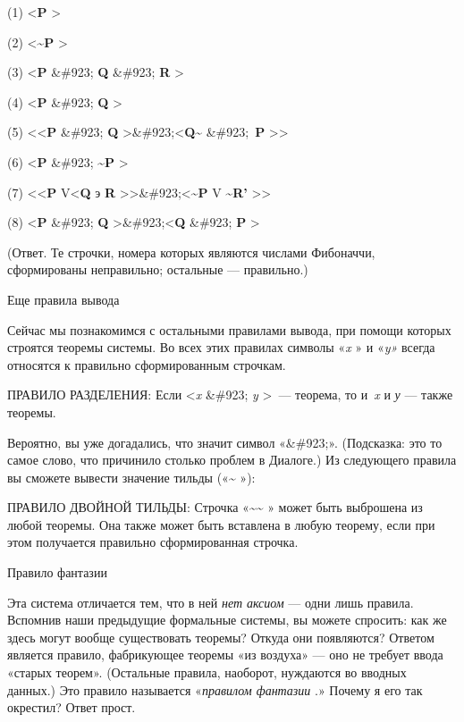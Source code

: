 (1) \textless{}\textbf{P} \textgreater{}

(2) \textless{}\textbf{\textasciitilde P} \textgreater{}

(3) \textless{}\textbf{P} \&\#923; \textbf{Q} \&\#923; \textbf{R} \textgreater{}

(4) \textless{}\textbf{P} \&\#923; \textbf{Q} \textgreater{}

(5) \textless\textless{}\textbf{P} \&\#923; \textbf{Q} \textgreater\&\#923;\textless{}\textbf{Q\textasciitilde{}} \&\#923;~\textbf{P} \textgreater\textgreater{}

(6) \textless{}\textbf{P} \&\#923; \textbf{\textasciitilde P} \textgreater{}

(7) \textless\textless{}\textbf{P} V\textless{}\textbf{Q} э \textbf{R} \textgreater\textgreater\&\#923;\textless{}\textbf{\textasciitilde P} V \textbf{\textasciitilde R'} \textgreater\textgreater{}

(8) \textless{}\textbf{P} \&\#923; \textbf{Q} \textgreater\&\#923;\textless{}\textbf{Q} \&\#923; \textbf{P} \textgreater{}

(Ответ. Те строчки, номера которых являются числами Фибоначчи, сформированы неправильно; остальные --- правильно.)

Еще правила вывода

Сейчас мы познакомимся с остальными правилами вывода, при помощи которых строятся теоремы системы. Во всех этих правилах символы «\emph{x} » и «\emph{y»} всегда относятся к правильно сформированным строчкам.

ПРАВИЛО РАЗДЕЛЕНИЯ: Если \textless{}\emph{x} \&\#923; \emph{y} \textgreater~--- теорема, то и~\emph{x} и \emph{у} --- также теоремы.

Вероятно, вы уже догадались, что значит символ «\&\#923;». (Подсказка: это то самое слово, что причинило столько проблем в Диалоге.) Из следующего правила вы сможете вывести значение тильды («\textbf{\textasciitilde{}} »):

ПРАВИЛО ДВОЙНОЙ ТИЛЬДЫ: Строчка «\textbf{\textasciitilde\textasciitilde{}} » может быть выброшена из любой теоремы. Она также может быть вставлена в любую теорему, если при этом получается правильно сформированная строчка.

Правило фантазии

Эта система отличается тем, что в ней \emph{нет аксиом} --- одни лишь правила. Вспомнив наши предыдущие формальные системы, вы можете спросить: как же здесь могут вообще существовать теоремы? Откуда они появляются? Ответом является правило, фабрикующее теоремы «из воздуха» --- оно не требует ввода «старых теорем». (Остальные правила, наоборот, нуждаются во вводных данных.) Это правило называется «\emph{правилом фантазии} .» Почему я его так окрестил? Ответ прост.

